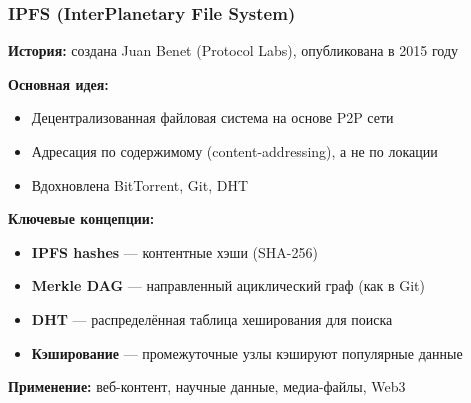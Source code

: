 \documentclass{beamer}
\begin{document}
\begin{frame}
\frametitle{IPFS (InterPlanetary File System)}

\textbf{История:} создана Juan Benet (Protocol Labs), опубликована в 2015 году

\textbf{Основная идея:}
\begin{itemize}
  \item Децентрализованная файловая система на основе P2P сети
  \item Адресация по содержимому (content-addressing), а не по локации
  \item Вдохновлена BitTorrent, Git, DHT
\end{itemize}

\textbf{Ключевые концепции:}
\begin{itemize}
  \item \textbf{IPFS hashes} — контентные хэши (SHA-256)
  \item \textbf{Merkle DAG} — направленный ациклический граф (как в Git)
  \item \textbf{DHT} — распределённая таблица хеширования для поиска
  \item \textbf{Кэширование} — промежуточные узлы кэшируют популярные данные
\end{itemize}


\textbf{Применение:} веб-контент, научные данные, медиа-файлы, Web3

\end{frame}
\end{document}
